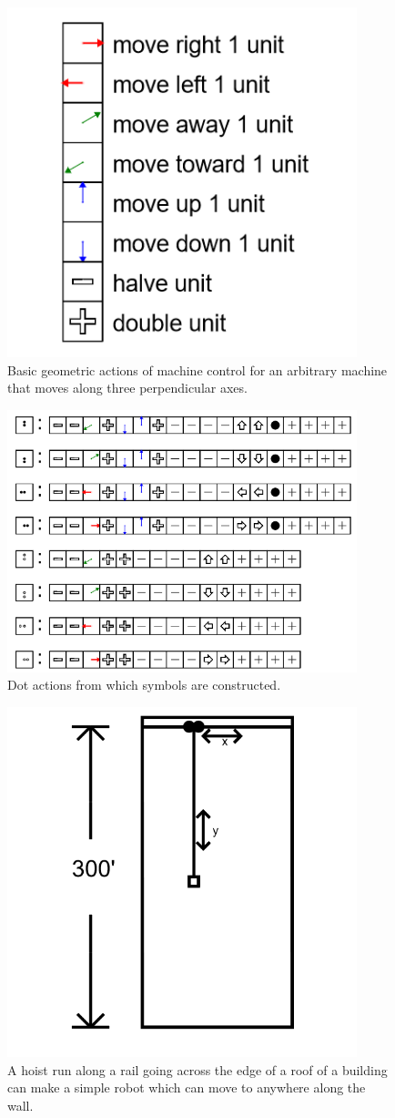 \begin{figure}
	\centering
	\includegraphics[width=4in]{figures/machines/basicmovements.png}
	\caption[basicmovements]
	{Basic geometric actions of machine control for an arbitrary machine that moves along three perpendicular axes.}
\end{figure}

\begin{figure}
	\centering
	\includegraphics[width=4in]{figures/machines/actions05xx.png}
	\caption[actions05xx]
	{Dot actions from which symbols are constructed.}
\end{figure}


\begin{figure}
	\centering
	\includegraphics[width=4in]{figures/machines/buildingwallrobot.png}
	\caption[buildingwallrobot]
	{A hoist run along a rail going across the edge of a roof of a building can make a simple robot which can move to anywhere along the wall.}
\end{figure}
